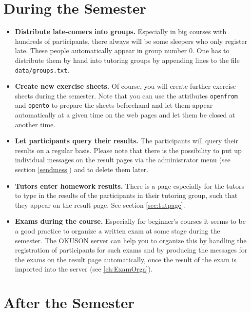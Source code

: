 \documentclass[12pt,openany,a4paper]{book}
\newcommand{\OKUSON}{\textsf{OKUSON}}
\begin{document}
\section{During the Semester}

\begin{itemize}
\item \textbf{Distribute late-comers into groups.} Especially in big
courses with hundreds of participants, there always will be some sleepers
who only register late. These people automatically appear in group number $0$.
One has to distribute them by hand into tutoring groups by appending lines
to the file \texttt{data/groups.txt}.
\item \textbf{Create new exercise sheets.} Of course, you will create
further exercise sheets during the semester. Note that you can use the
attributes \texttt{openfrom} and \texttt{opento} to prepare the sheets
beforehand and let them appear automatically at a given time on the web
pages and let them be closed at another time. 
\item \textbf{Let participants query their results.} The participants will
query their results on a regular basis. Please note that there is the 
possibility to put up individual messages on the result pages via the
administrator menu (see section \ref{sendmess}) and to delete them
later.
\item \textbf{Tutors enter homework results.} There is a page especially
for the tutors to type in the results of the participants in their 
tutoring group, such that they appear on the result page. See section
\ref{sec:tutpage}.
\item \textbf{Exams during the course.} Especially for beginner's courses
it seems to be a good practice to organize a written exam at some stage
during the semester. The {\OKUSON} server can help you to organize this
by handling the registration of participants for such exams and by
producing the messages for the exams on the result page automatically,
once the result of the exam is imported into the server (see
\ref{ch:ExamOrga}).
\end{itemize}

\section{After the Semester}
\end{document}
